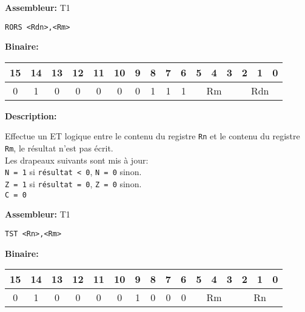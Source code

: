 \documentclass{article}
\begin{document}
    \textbf{Assembleur:} T1

    \begin{lstlisting}
RORS <Rdn>,<Rm>
    \end{lstlisting}

    \textbf{Binaire:}

    \begin{tabular}{| c c c c c c c c c c c c c c c c |}
        \hline
        15 & 14 & 13 & 12 & 11 & 10 & \multicolumn{1}{|c}{9} & 8 & 7 & 6 & \multicolumn{1}{|c}{5} & 4 & 3 & \multicolumn{1}{|c}{2} & 1 & 0 \\
        \hline
        0 & 1 & 0 & 0 & 0 & 0 & \multicolumn{1}{|c}{0} & 1 & 1 & 1 & \multicolumn{3}{|c}{Rm} & \multicolumn{3}{|c|}{Rdn} \\
        \hline
    \end{tabular}



    \textbf{Description: }

    Effectue un ET logique entre le contenu du registre \texttt{Rn} et le contenu du registre \texttt{Rm}, le résultat n'est pas écrit.\\
    Les drapeaux suivants sont mis à jour:\\
    \texttt{N = 1} si \texttt{résultat < 0}, \texttt{N = 0} sinon.\\
    \texttt{Z = 1} si \texttt{résultat = 0}, \texttt{Z = 0} sinon.\\
    \texttt{C = 0}

    \textbf{Assembleur:} T1

    \begin{lstlisting}
TST <Rn>,<Rm>
    \end{lstlisting}

    \textbf{Binaire:}

    \begin{tabular}{| c c c c c c c c c c c c c c c c |}
        \hline
        15 & 14 & 13 & 12 & 11 & 10 & \multicolumn{1}{|c}{9} & 8 & 7 & 6 & \multicolumn{1}{|c}{5} & 4 & 3 & \multicolumn{1}{|c}{2} & 1 & 0 \\
        \hline
        0 & 1 & 0 & 0 & 0 & 0 & \multicolumn{1}{|c}{1} & 0 & 0 & 0 & \multicolumn{3}{|c}{Rm} & \multicolumn{3}{|c|}{Rn} \\
        \hline
    \end{tabular}



\end{document}
